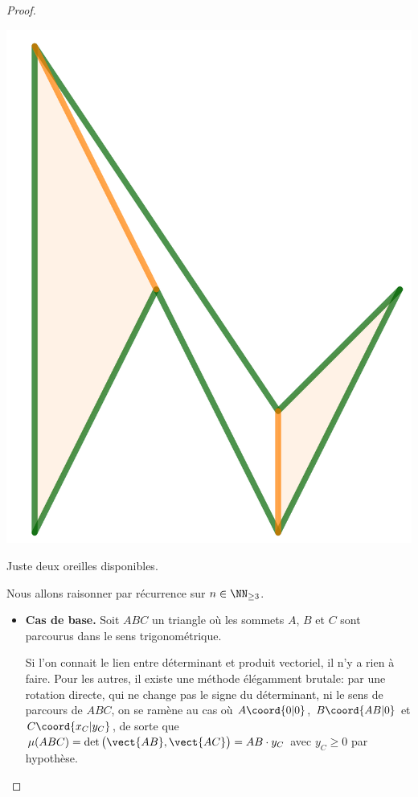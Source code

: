 \begin{proof}
\begin{multicols}{2}
    	\begin{center}
        	\includegraphics[scale=.4]{content/polygon/sufficient-cond/mini-ear-2.png}
        
        	\smallskip
       		Juste deux oreilles disponibles.
    	\end{center}
    \end{multicols}
    
    
	Nous allons raisonner par récurrence sur $n \in \NN_{\geq3}$.
	
	\begin{itemize}
		\item \textbf{Cas de base.} 
		Soit $ABC$ un triangle où les sommets $A$, $B$ et $C$ sont parcourus dans le sens trigonométrique.
		
		\noindent
		Si l'on connait le lien entre déterminant et produit vectoriel, il n'y a rien à faire. Pour les autres, il existe une méthode élégamment brutale: par une rotation directe, qui ne change pas le signe du déterminant, ni le sens de parcours de $ABC$, on se ramène au cas où $A\coord{0|0}$, $B\coord{AB|0}$ et $C\coord{x_C | y_C}$, de sorte que $\mu(ABC) = \det \big( \vect{AB} , \vect{AC} \big) = AB \cdot y_C$ avec $y_C \geq 0$ par hypothèse.



\end{itemize}
\end{proof}
